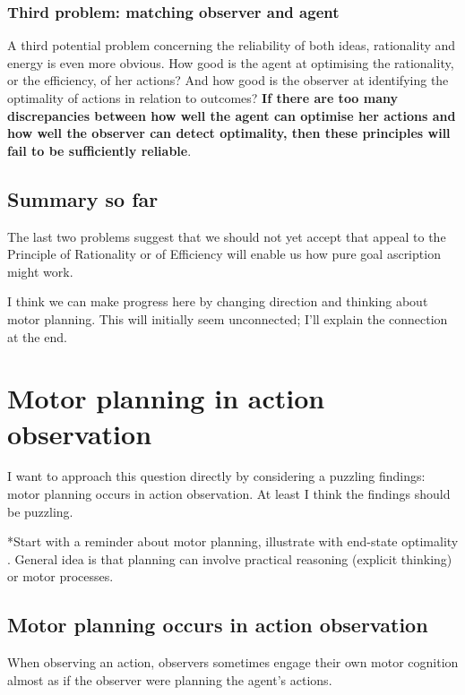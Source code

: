\documentclass[12pt,\papersize]{extarticle}
\begin{document}
\subsubsection{Third problem: matching observer and agent}

A third potential problem concerning the reliability of both ideas, rationality and energy is even more obvious.
How good is the agent at optimising the rationality, or the efficiency, of her actions?
And how good is the observer at identifying the optimality of actions in relation to outcomes?
\textbf{
If there are too many discrepancies between
		how well the agent can optimise her actions
	and
		how well the observer can detect optimality,
then these principles will fail to be sufficiently reliable}.


\subsection{Summary so far}
The last two problems suggest that 
	we should not yet accept that appeal to the Principle of Rationality or of Efficiency will enable us how pure goal ascription might work.

I think we can make progress here by changing direction and thinking about motor planning.
This will initially seem unconnected;
I'll explain the connection at the end.


\section{Motor planning in action observation}

I want to approach this question directly by considering a puzzling findings:
motor planning occurs in action observation.
At least I think the findings should be puzzling.

*Start with a reminder about motor planning, illustrate with end-state optimality \citep{zhang:2007_planning}.
General idea is that planning can involve practical reasoning (explicit thinking) or motor processes.


\subsection{Motor planning occurs in action observation}
When observing an action,
	observers sometimes engage their own motor cognition 
	almost as if the observer were planning the agent's actions. 
\end{document}
